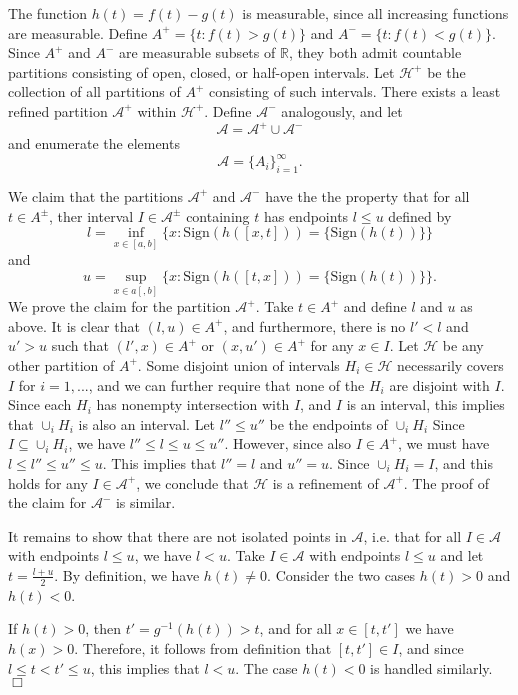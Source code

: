 \documentclass[12pt]{article}
\begin{document}
The function $h(t) = f(t) - g(t)$ is measurable, since all increasing
functions are measurable.  Define $A^+ = \{t: f(t) > g(t)\}$ and $A^-
= \{t: f(t) < g(t)\}$.  Since $A^+$ and $A^-$ are measurable subsets
of $\mathbb{R}$, they both admit countable partitions consisting of open, closed, or half-open
intervals.  Let $\mathcal{H}^+$ be the collection of all partitions of $A^+$ consisting of such intervals.
There exists a least refined partition $\mathcal{A}^+$ within $\mathcal{H}^+$.
Define $\mathcal{A}^-$ analogously, and let
\[
\mathcal{A} = \mathcal{A}^+ \cup \mathcal{A}^-
\]
and enumerate the elements
\[
\mathcal{A} = \{A_i\}_{i=1}^\infty.
\]

We claim that the partitions $\mathcal{A}^+$ and $\mathcal{A}^-$ have
the the property that for all $t \in A^\pm$, ther interval
$I \in \mathcal{A}^\pm$ containing $t$ has endpoints $l \leq u$
defined by
\[
l = \inf_{x \in [a,b]} \{x: \text{Sign}(h([x, t])) = \{\text{Sign}(h(t))\} \}
\]
and
\[
u = \sup_{x \in a[,b]} \{x: \text{Sign}(h([t, x])) = \{\text{Sign}(h(t))\}\}.
\]
We prove the claim for the partition $\mathcal{A}^+$.  Take $t \in
A^+$ and define $l$ and $u$ as above.  It is clear that $(l, u) \in
A^+$, and furthermore, there is no $l' < l$ and $u' > u$ such that
$(l', x) \in A^+$ or $(x, u') \in A^+$ for any $x \in I$.  Let
$\mathcal{H}$ be any other partition of $A^+$.  Some disjoint union of
intervals $H_i \in \mathcal{H}$ necessarily covers $I$ for $i =
1,...$, and we can further require that none of the $H_i$ are disjoint
with $I$.  Since each $H_i$ has nonempty intersection with $I$, and
$I$ is an interval, this implies that $\cup_i H_i$ is also an
interval.  Let $l'' \leq u''$ be the endpoints of $\cup_i H_i$ Since
$I \subseteq \cup_i H_i$, we have $l'' \leq l \leq u \leq u''$.
However, since also $I \in A^+$, we must have $l \leq l'' \leq
u'' \leq u$.  This implies that $l''=l$ and $u''=u$.  Since $\cup_i
H_i = I$, and this holds for any $I \in \mathcal{A}^+$, we conclude
that $\mathcal{H}$ is a refinement of $\mathcal{A}^+$. The proof of
the claim for $\mathcal{A}^-$ is similar.

It remains to show that there are not isolated points in
$\mathcal{A}$, i.e. that for all $I \in \mathcal{A}$ with endpoints
$l \leq u$, we have $l < u$.  Take $I \in \mathcal{A}$ with endpoints
$l \leq u$ and let $t = \frac{l+u}{2}$.  By definition, we have
$h(t) \neq 0$.  Consider the two cases $h(t) > 0$ and $h(t) < 0$.

If $h(t) > 0$, then $t' = g^{-1}(h(t)) > t$, and for all $x \in [t,
t']$ we have $h(x) > 0$.  Therefore, it follows from definition that
$[t, t'] \in I$, and since $l \leq t < t' \leq u$, this implies that
$l < u$.  The case $h(t) < 0$ is handled similarly. $\Box$
\end{document}
